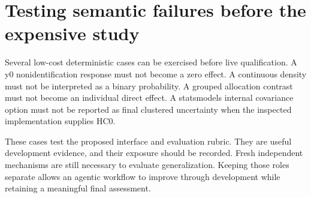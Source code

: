 \section{Testing semantic failures before the expensive study}

Several low-cost deterministic cases can be exercised before live qualification.
A y0 nonidentification response must not become a zero effect. A continuous
density must not be interpreted as a binary probability. A grouped allocation
contrast must not become an individual direct effect. A statsmodels internal
covariance option must not be reported as final clustered uncertainty when the
inspected implementation supplies HC0. \cite{v13_sw_y0,v13_sw_causalgps,v13_sw_inferference,v13_sw_statsmodels}

These cases test the proposed interface and evaluation rubric. They are useful
development evidence, and their exposure should be recorded. Fresh independent
mechanisms are still necessary to evaluate generalization. Keeping those roles
separate allows an agentic workflow to improve through development while
retaining a meaningful final assessment.
